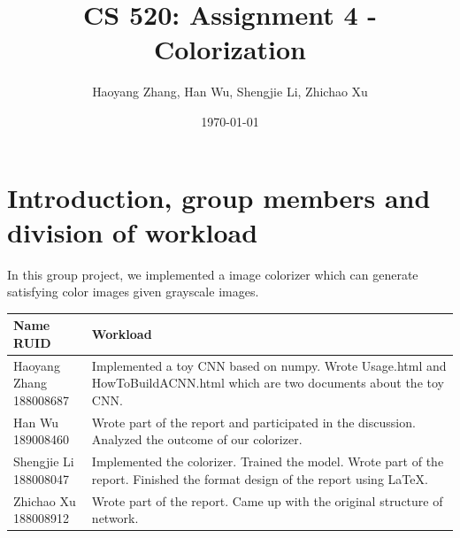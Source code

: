 \documentclass[letter]{article}
\title{CS 520: Assignment 4 - Colorization}
\author{Haoyang Zhang, Han Wu, Shengjie Li, Zhichao Xu}
\date{\today}
\begin{document}
\maketitle

\section{Introduction, group members and division of workload}
\label{sec:Introduction}

In this group project, we implemented a image colorizer which can generate satisfying color images given grayscale images. \\
\begin{tabular}{| p{2.5cm} | p{\textwidth -3.5cm} |}
	\hline
	\makecell[c]{Name \\ RUID} & Workload \\
	\hline
	\makecell[c]{Haoyang Zhang \\ 188008687} & {Implemented a toy CNN based on numpy. Wrote Usage.html and HowToBuildACNN.html which are two documents about the toy CNN.} \\
	\hline
	\makecell[c]{Han Wu \\ 189008460} & {Wrote part of the report and participated in the discussion. Analyzed the outcome of our colorizer.} \\
	\hline
	\makecell[c]{Shengjie Li \\ 188008047} & {Implemented the colorizer. Trained the model. Wrote part of the report. Finished the format design of the report using \LaTeX. } \\
	\hline
	\makecell[c]{Zhichao Xu \\ 188008912} & {Wrote part of the report. Came up with the original structure of network.} \\
	\hline
\end{tabular}
\end{document}

